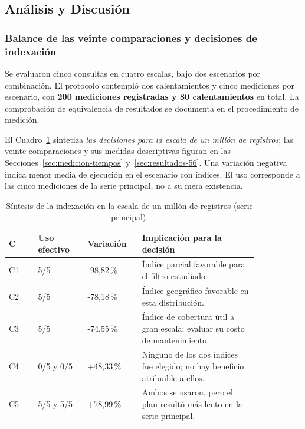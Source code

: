\documentclass[12pt,a4paper]{article}
\begin{document}
\Needspace{0.52\textheight}
\subsection{Análisis y Discusión}
\label{sec:analisis-global-56}

\subsubsection{Balance de las veinte comparaciones y decisiones de indexación}
\label{sec:comparacion-global-56}
\label{sec:interpretacion-global-56}

Se evaluaron cinco consultas en cuatro escalas, bajo dos escenarios
por combinación. El protocolo contempló dos calentamientos y cinco
mediciones por escenario, con \textbf{200 mediciones registradas y 80
calentamientos} en total. La comprobación de equivalencia de
resultados se documenta en el procedimiento de medición.

El Cuadro~\ref{tab:resumen-global-56} sintetiza \emph{las decisiones
para la escala de un millón de registros}; las veinte comparaciones
y sus medidas descriptivas figuran en las Secciones~\ref{sec:medicion-tiempos}
y~\ref{sec:resultados-56}. Una variación negativa indica menor
media de ejecución en el escenario con índices. El uso corresponde
a las cinco mediciones de la serie principal, no a su mera existencia.

\begin{table}[H]
\centering\small
\setlength{\tabcolsep}{5pt}
\renewcommand{\arraystretch}{1.12}
\begin{tabular}{p{0.10\linewidth}p{0.17\linewidth}p{0.17\linewidth}p{0.40\linewidth}}
\toprule
\textbf{C} & \textbf{Uso efectivo} & \textbf{Variación} & \textbf{Implicación para la decisión} \\
\midrule
C1 & 5/5 & -98,82\,\% & Índice parcial favorable para el filtro estudiado. \\
C2 & 5/5 & -78,18\,\% & Índice geográfico favorable en esta distribución. \\
C3 & 5/5 & -74,55\,\% & Índice de cobertura útil a gran escala; evaluar su costo de mantenimiento. \\
C4 & 0/5 y 0/5 & +48,33\,\% & Ninguno de los dos índices fue elegido; no hay beneficio atribuible a ellos. \\
C5 & 5/5 y 5/5 & +78,99\,\% & Ambos se usaron, pero el plan resultó más lento en la serie principal. \\
\bottomrule
\end{tabular}

\caption{Síntesis de la indexación en la escala de un millón de registros (serie principal).}
\label{tab:resumen-global-56}
\end{table}
\end{document}
